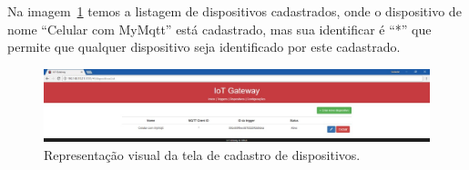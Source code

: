 Na imagem~\ref{fig:dispositivoCadastrado} temos a listagem de dispositivos cadastrados, onde o dispositivo de nome “Celular com MyMqtt” está cadastrado, mas sua identificar é “*” que permite que qualquer dispositivo seja identificado por este cadastrado.
\begin{figure}[h!]
	\begin{center}
		\includegraphics[width=1.085\textwidth]{./img/dispositivoCadastrado}
		\caption{Representação visual da tela de cadastro de dispositivos.}
		\label{fig:dispositivoCadastrado}
	\end{center}
\end{figure}

